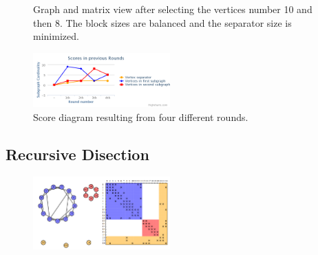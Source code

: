 \documentclass[12pt, oneside]{book}
\begin{document}
\begin{figure}
\centering
{}%
\caption{Graph and matrix view after selecting the vertices number 10 and then 8. The block sizes are balanced and the separator size is minimized.}
\label{selected810}
\end{figure}

\begin{figure}
\centering
\includegraphics[width=0.47\textwidth]{diagram}
\caption{Score diagram resulting from four different rounds.}
\label{diagram}
\end{figure}

\subsection{Recursive Disection}
\begin{figure}
\centering
\includegraphics[width=0.47\textwidth]{bad_bisection}
\caption{}
\label{bad_bisection}
\end{figure}
\end{document}
